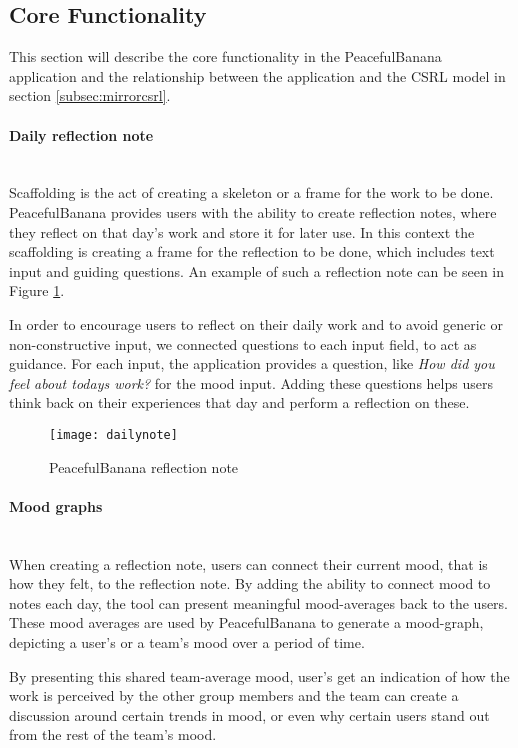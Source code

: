 \subsection{Core Functionality}
\label{sec:corefunctionality}
This section will describe the core functionality in the PeacefulBanana application and the relationship between the application and the CSRL model in section \ref{subsec:mirrorcsrl}. 
\paragraph{Daily reflection note}\mbox{}\\
Scaffolding is the act of creating a skeleton or a frame for the work to be done.
PeacefulBanana provides users with the ability to create reflection notes, where they reflect on that day's work and store it for later use. In this context the scaffolding is creating a frame for the reflection to be done, which includes text input and guiding questions. An example of such a reflection note can be seen in Figure \ref{dailynotefunc}. 

In order to encourage users to reflect on their daily work and to avoid generic or non-constructive input, we connected questions to each input field, to act as guidance. For each input, the application provides a question, like \emph{How did you feel about todays work?} for the mood input. Adding these questions helps users think back on their experiences that day and perform a reflection on these. 
\begin{figure}[H]
    \centering
        \texttt{[image: dailynote]}
    \caption{PeacefulBanana reflection note}
    \label{dailynotefunc}
\end{figure}
\clearpage
\paragraph{Mood graphs}\mbox{}\\
When creating a reflection note, users can connect their current mood, that is how they felt, to the reflection note. By adding the ability to connect mood to notes each day, the tool can present meaningful mood-averages back to the users. These mood averages are used by PeacefulBanana to generate a mood-graph, depicting a user's or a team's mood over a period of time. 

By presenting this shared team-average mood, user's get an indication of how the work is perceived by the other group members and the team can create a discussion around certain trends in mood, or even why certain users stand out from the rest of the team's mood. 

